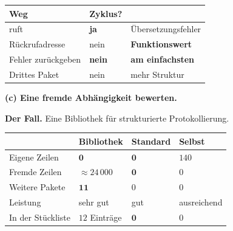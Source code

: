 \begin{aufgabe}
\begin{center}
\renewcommand{\arraystretch}{1.45}
\begin{tabular}{@{}P{3.0cm}P{2.2cm}P{2.8cm}@{}}
\toprule
\textbf{Weg} & \textbf{Zyklus?} & \\
\midrule
{} ruft  & \textcolor{akzent}{\textbf{ja}} & \textcolor{akzent}{Über\-setzungs\-fehler}\\
Rückrufadresse & \textcolor{gruen}{nein} & \textcolor{gruen}{\textbf{Funktionswert}}\\
Fehler zurückgeben & \textcolor{gruen}{\textbf{nein}} & \textcolor{gruen}{\textbf{am einfachsten}}\\
Drittes Paket & \textcolor{gruen}{nein} & \textcolor{mittel}{mehr Struktur}\\
\bottomrule
\end{tabular}
\end{center}

\begin{center}
\begin{minipage}{0.88\textwidth}
\end{minipage}
\end{center}

\begin{center}
\end{center}

\medskip
\textbf{(c) Eine fremde Abhängigkeit bewerten.}

\textbf{Der Fall.} Eine Bibliothek für strukturierte Protokollierung.

\begin{center}
{\small
\renewcommand{\arraystretch}{1.45}
\begin{tabular}{@{}P{2.6cm}P{2.0cm}P{2.2cm}P{2.0cm}@{}}
\toprule
& \textbf{Bibliothek} & \textbf{Standard} & \textbf{Selbst}\\
\midrule
Eigene Zeilen & $\mathbf{0}$ & $\mathbf{0}$ & $140$\\
Fremde Zeilen & \textcolor{akzent}{$\approx24\,000$} & \textcolor{gruen}{$\mathbf{0}$} & \textcolor{gruen}{$0$}\\
Weitere Pakete & \textcolor{akzent}{$\mathbf{11}$} & $0$ & $0$\\
Leistung & \textcolor{gruen}{sehr gut} & \textcolor{gruen}{gut} & \textcolor{mittel}{ausreichend}\\
In der Stückliste & \textcolor{akzent}{$12$ Einträge} & \textcolor{gruen}{$\mathbf{0}$} & \textcolor{gruen}{$0$}\\
\bottomrule
\end{tabular}}
\end{center}


\end{aufgabe}
